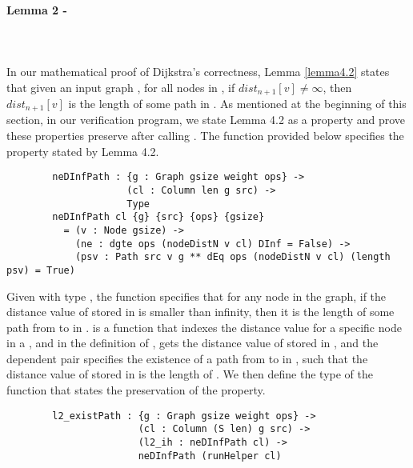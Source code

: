\paragraph{Lemma 2 - } \label{lemma2V}
\tab\\\\
In our mathematical proof of Dijkstra's correctness, Lemma \ref{lemma4.2} states that given an input graph , for all nodes  in , if $dist_{n+1}[v] \neq \infty$, then $dist_{n+1}[v]$ is the length of some  path in . As mentioned at the beginning of this section, in our verification program, we state Lemma 4.2 as a  property and prove these properties preserve after calling . The function  provided below specifies the  property stated by Lemma 4.2.
\begin{lstlisting}
		neDInfPath : {g : Graph gsize weight ops} ->
		             (cl : Column len g src) ->
		             Type
		neDInfPath cl {g} {src} {ops} {gsize}
		  = (v : Node gsize) ->
		    (ne : dgte ops (nodeDistN v cl) DInf = False) ->
		    (psv : Path src v g ** dEq ops (nodeDistN v cl) (length psv) = True)
\end{lstlisting}
 
Given  with type , the function  specifies that for any node  in the graph, if the distance value of  stored in  is smaller than infinity, then it is the length of some path from  to  in .  is a function that indexes the distance value for a specific node in a , and in the definition of ,  gets the distance value of  stored in , and the dependent pair  specifies the existence of a path  from  to  in , such that the distance value of  stored in  is the length of . We then define the type of the function  that states the preservation of the  property. 
\begin{lstlisting}
		l2_existPath : {g : Graph gsize weight ops} ->
		               (cl : Column (S len) g src) ->
		               (l2_ih : neDInfPath cl) ->
		               neDInfPath (runHelper cl)
\end{lstlisting}

